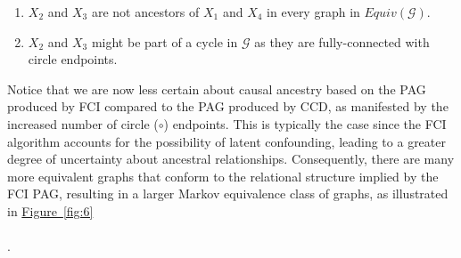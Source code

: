 \documentclass[twoside, 11pt]{article}
\newcommand{\starstar}{%
\begin{tikzpicture}[baseline=-3pt]
    \draw [{Rays[n=6]}-{Rays[n=6]}] (0,0) -- (0.55,0);
\end{tikzpicture}
}
\newcommand{\stararrow}{%
\begin{tikzpicture}
    \draw [{Rays[n=6]}-{Straight Barb[length=2.5pt]}] (0,0) -- (0.5, 0);
\end{tikzpicture}
}
\newcommand{\arrowstar}{%
\begin{tikzpicture}
    \draw [{Straight Barb[length=2.5pt]}-{Rays[n=6]}] (0,0) -- (0.5, 0);
\end{tikzpicture}
}
\newcommand*{\figref}[2][]{%
  \hyperref[{fig:#2}]{%
    Figure~\ref*{fig:#2}%
    \ifx\\#1\\%
    \else
      #1%
    \fi
  }%
}
\begin{document}
\begin{enumerate}[nolistsep]
    \item $X_2$ and $X_3$ are not ancestors of $X_1$ and $X_4$ in every graph in $Equiv(\mathcal{G})$.
    \item $X_2$ and $X_3$ might be part of a cycle in $\mathcal{G}$ as they are fully-connected with circle endpoints.
\end{enumerate}

\noindent Notice that we are now less certain about causal ancestry based on the PAG produced by FCI compared to the PAG produced by CCD, as manifested by the increased number of circle ($\circ$) endpoints. 
 This is typically the case since the FCI algorithm accounts for the possibility of latent confounding, leading to a greater degree of uncertainty about ancestral relationships. Consequently, there are many more equivalent graphs that conform to the relational structure implied by the FCI PAG, resulting in a larger Markov equivalence class of graphs, as illustrated in \figref[]{6}.





\end{document}
